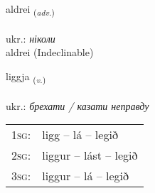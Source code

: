 \documentclass[frontgrid, backgrid]{flacards}\usepackage[]{graphicx}\usepackage[]{xcolor}
\begin{document}
\renewcommand{\flhead}{\vskip5pt \fboxsep=0pt {\small\bfseries\footnotesize Atviksorð | прислівник}}
\renewcommand{\fcfoot}{\vskip5pt \fboxsep=0pt \hspace{2pt}{\small\bfseries\footnotesize 1K}}

\renewcommand{\blhead}{\vskip5pt {\small\bfseries\footnotesize Atviksorð | прислівник }}
\renewcommand{\bcfoot}{\vskip5pt \hspace{2pt}{\small\bfseries\footnotesize 1K}}


{aldrei \small{\textsubscript{(\textit{adv.})}} \\[1ex]
\textphonetic{[altrei]} \\
ukr.: \emph{ніколи} \\  [2ex]
aldrei (Indeclinable)}

\renewcommand{\flhead}{\vskip5pt \fboxsep=0pt {\small\bfseries\footnotesize Sagnorð | дієслово}}
\renewcommand{\fcfoot}{\vskip5pt \fboxsep=0pt \hspace{2pt}{\small\bfseries\footnotesize 1K}}

\renewcommand{\blhead}{\vskip5pt {\small\bfseries\footnotesize Sagnorð | дієслово }}
\renewcommand{\bcfoot}{\vskip5pt \hspace{2pt}{\small\bfseries\footnotesize 1K}}


{liggja \small{\textsubscript{(\textit{v.})}} \\[1ex] %
\textphonetic{[lɪca]} \\
ukr.: \emph{брехати / казати неправду} \\  [2ex]
\renewcommand*{\arraystretch}{0.8}
\begin{tabular}{p{1cm}l}
\textsc{1sg}: & ligg -- lá -- legið \\ 
\textsc{2sg}: & liggur -- lást -- legið \\ 
\textsc{3sg}: & liggur -- lá -- legið \\ 
\end{tabular}
}

\renewcommand{\flhead}{\vskip5pt \fboxsep=0pt {\small\bfseries\footnotesize Sagnorð | дієслово}}
\renewcommand{\fcfoot}{\vskip5pt \fboxsep=0pt \hspace{2pt}{\small\bfseries\footnotesize 1K}}
\end{document}
